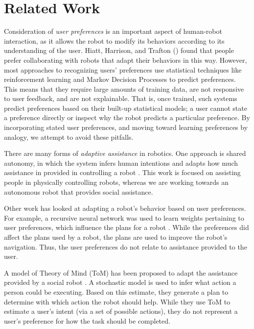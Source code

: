 \documentclass[letterpaper]{article} %
\begin{document}
\section{Related Work}
Consideration of \textit{user preferences} is an important aspect of human-robot interaction, as it allows the robot to modify its behaviors according to its understanding of the user. Hiatt, Harrison, and Trafton (\citeyear{hiatt2011accommodating}) found that people prefer collaborating with robots that adapt their behaviors in this way. However, most approaches to recognizing users' preferences use statistical techniques like reinforcement learning \cite{woodworth2018preference} and Markov Decision Processes \cite{munzer2017preference} to predict preferences. This means that they require large amounts of training data, are not responsive to user feedback, and are not explainable. That is, once trained, such systems predict preferences based on their built-up statistical models; a user cannot state a preference directly or inspect why the robot predicts a particular preference. By incorporating stated user preferences, and moving toward learning preferences by analogy, we attempt to avoid these pitfalls.

There are many forms of \textit{adaptive assistance} in robotics.  One approach is
shared autonomy, in which the system infers human intentions and adapts how
much assistance in provided in controlling a robot \cite{Nikolaidis2017,Jain2019}.
This work is focused on assisting people in physically controlling robots,
whereas we are working towards an autonomous robot that provides social assistance.

Other work has looked at adapting a robot's behavior based on user preferences.
For example, a recursive neural network was used
to learn weights pertaining to user preferences, which influence the plans for
a robot \cite{Bacciu2014}.  While the preferences did affect the plans used by a robot,
the plans are used to improve the
robot's navigation.  Thus, the user preferences do not relate to assistance
provided to the user.

A model of Theory of Mind (ToM) has been proposed to adapt the assistance provided
by a social robot \cite{Gorur2017}.  A stochastic model is used to infer what action a person could
be executing.  Based on this estimate, they generate a plan to determine with which
action the robot should help.
While they use ToM to estimate a user's intent (via a set of possible actions),
they do not represent a user's preference for how the task should be completed.
\end{document}
